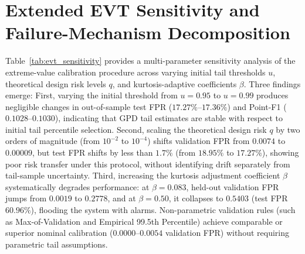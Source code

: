 \section{Extended EVT Sensitivity and Failure-Mechanism Decomposition}
\label{sup:evt_detail}



Table~\ref{tab:evt_sensitivity} provides a multi-parameter sensitivity analysis of the extreme-value calibration procedure across varying initial tail thresholds $u$, theoretical design risk levels $q$, and kurtosis-adaptive coefficients $\beta$. Three findings emerge:
First, varying the initial threshold from $u=0.95$ to $u=0.99$ produces negligible changes in out-of-sample test FPR ($17.27\%\text{--}17.36\%$) and Point-F1 ($0.1028\text{--}0.1030$), indicating that GPD tail estimates are stable with respect to initial tail percentile selection.
Second, scaling the theoretical design risk $q$ by two orders of magnitude (from $10^{-2}$ to $10^{-4}$) shifts validation FPR from $0.0074$ to $0.00009$, but test FPR shifts by less than $1.7\%$ (from $18.95\%$ to $17.27\%$), showing poor risk transfer under this protocol, without identifying drift separately from tail-sample uncertainty.
Third, increasing the kurtosis adjustment coefficient $\beta$ systematically degrades performance: at $\beta=0.083$, held-out validation FPR jumps from $0.0019$ to $0.2778$, and at $\beta=0.50$, it collapses to $0.5403$ (test FPR $60.96\%$), flooding the system with alarms. Non-parametric validation rules (such as Max-of-Validation and Empirical 99.5th Percentile) achieve comparable or superior nominal calibration ($0.0000\text{--}0.0054$ validation FPR) without requiring parametric tail assumptions.



